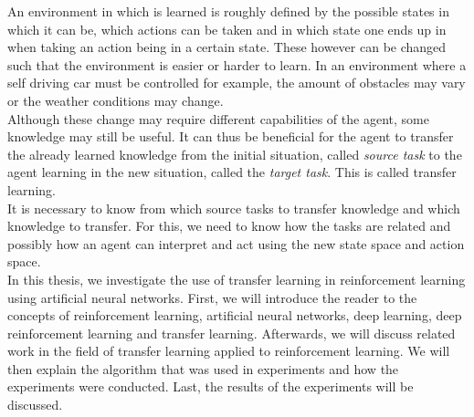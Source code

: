 An environment in which is learned is roughly defined by the possible states in which it can be, which actions can be taken and in which state one ends up in when taking an action being in a certain state.
These however can be changed such that the environment is easier or harder to learn.
In an environment where a self driving car must be controlled for example, the amount of obstacles may vary or the weather conditions may change.\\
Although these change may require different capabilities of the agent, some knowledge may still be useful.
It can thus be beneficial for the agent to transfer the already learned knowledge from the initial situation, called \textit{source task} to the agent learning in the new situation, called the \textit{target task}.
This is called transfer learning.\\
It is necessary to know from which source tasks to transfer knowledge and which knowledge to transfer.
For this, we need to know how the tasks are related and possibly how an agent can interpret and act using the new state space and action space.\\

In this thesis, we investigate the use of transfer learning in reinforcement learning using artificial neural networks.
First, we will introduce the reader to the concepts of reinforcement learning, artificial neural networks, deep learning, deep reinforcement learning and transfer learning.
Afterwards, we will discuss related work in the field of transfer learning applied to reinforcement learning.
We will then explain the algorithm that was used in experiments and how the experiments were conducted.
Last, the results of the experiments will be discussed.
